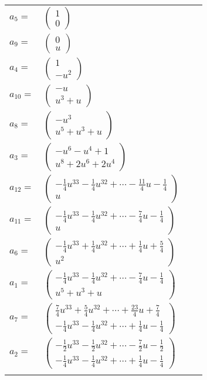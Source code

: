 \documentclass[1p]{elsarticle_modified}
\theoremstyle{definition}
\begin{document}
\begin{tabular}{m{7pt} m{180pt} m{7pt} m{180pt} }
\flushright $a_{5}=$&$\begin{pmatrix}1\\0\end{pmatrix}$ \\
\flushright $a_{9}=$&$\begin{pmatrix}0\\u\end{pmatrix}$ \\
\flushright $a_{4}=$&$\begin{pmatrix}1\\- u^2\end{pmatrix}$ \\
\flushright $a_{10}=$&$\begin{pmatrix}- u\\u^3+u\end{pmatrix}$ \\
\flushright $a_{8}=$&$\begin{pmatrix}- u^3\\u^5+u^3+u\end{pmatrix}$ \\
\flushright $a_{3}=$&$\begin{pmatrix}- u^6- u^4+1\\u^8+2 u^6+2 u^4\end{pmatrix}$ \\
\flushright $a_{12}=$&$\begin{pmatrix}-\frac{1}{4} u^{33}-\frac{1}{4} u^{32}+\cdots-\frac{11}{4} u-\frac{1}{4}\\u\end{pmatrix}$ \\
\flushright $a_{11}=$&$\begin{pmatrix}-\frac{1}{4} u^{33}-\frac{1}{4} u^{32}+\cdots-\frac{7}{4} u-\frac{1}{4}\\u\end{pmatrix}$ \\
\flushright $a_{6}=$&$\begin{pmatrix}-\frac{1}{4} u^{33}+\frac{1}{4} u^{32}+\cdots+\frac{1}{4} u+\frac{5}{4}\\u^2\end{pmatrix}$ \\
\flushright $a_{1}=$&$\begin{pmatrix}-\frac{1}{4} u^{33}-\frac{1}{4} u^{32}+\cdots-\frac{7}{4} u-\frac{1}{4}\\u^5+u^3+u\end{pmatrix}$ \\
\flushright $a_{7}=$&$\begin{pmatrix}\frac{7}{4} u^{33}+\frac{5}{4} u^{32}+\cdots+\frac{23}{4} u+\frac{7}{4}\\-\frac{1}{4} u^{33}-\frac{1}{4} u^{32}+\cdots+\frac{1}{4} u-\frac{1}{4}\end{pmatrix}$ \\
\flushright $a_{2}=$&$\begin{pmatrix}-\frac{1}{2} u^{33}-\frac{1}{2} u^{32}+\cdots-\frac{7}{2} u-\frac{1}{2}\\-\frac{1}{4} u^{33}-\frac{1}{4} u^{32}+\cdots+\frac{1}{4} u-\frac{1}{4}\end{pmatrix}$\\&\end{tabular}
\end{document}
